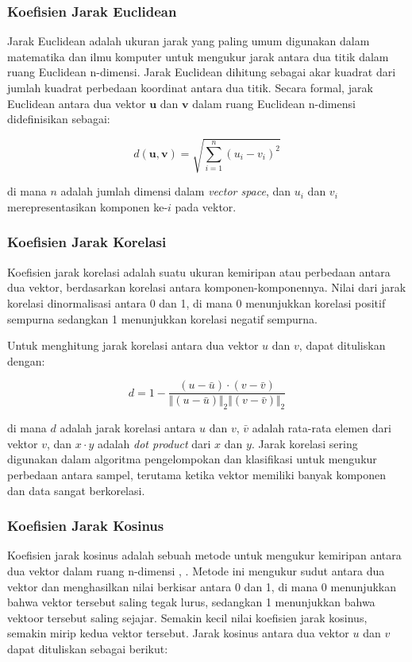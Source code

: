 \subsubsection{Koefisien Jarak Euclidean}
Jarak Euclidean adalah ukuran jarak yang paling umum digunakan dalam matematika dan ilmu komputer untuk mengukur jarak antara dua titik dalam ruang Euclidean n-dimensi. Jarak Euclidean dihitung sebagai akar kuadrat dari jumlah kuadrat perbedaan koordinat antara dua titik.
Secara formal, jarak Euclidean antara dua vektor $\mathbf{u}$ dan $\mathbf{v}$ dalam ruang Euclidean n-dimensi didefinisikan sebagai:

\begin{equation}
  d(\mathbf{u},\mathbf{v}) = \sqrt{\sum_{i=1}^{n}(u_i - v_i)^2}
\end{equation}

\noindent di mana $n$ adalah jumlah dimensi dalam \emph{vector space}, dan $u_i$ dan $v_i$ merepresentasikan komponen ke-$i$ pada vektor.

\subsubsection{Koefisien Jarak Korelasi}
Koefisien jarak korelasi adalah suatu ukuran kemiripan atau perbedaan antara dua vektor, berdasarkan korelasi antara komponen-komponennya. Nilai dari jarak korelasi dinormalisasi antara 0 dan 1, di mana 0 menunjukkan korelasi positif sempurna sedangkan 1 menunjukkan korelasi negatif sempurna.

Untuk menghitung jarak korelasi antara dua vektor $u$ dan $v$, dapat dituliskan dengan:

\begin{equation}
	d = 1-\frac{(u-\bar{u})\cdot (v-\bar{v})}{\Vert(u-\bar{u})\Vert_2\Vert(v-\bar{v})\Vert_2}
\end{equation}

\noindent di mana $d$ adalah jarak korelasi antara $u$ dan $v$, $\bar{v}$ adalah rata-rata elemen dari vektor $v$, dan $x\cdot y$ adalah \emph{dot product} dari $x$ dan $y$. Jarak korelasi sering digunakan dalam algoritma pengelompokan dan klasifikasi untuk mengukur perbedaan antara sampel, terutama ketika vektor memiliki banyak komponen dan data sangat berkorelasi.

\subsubsection{Koefisien Jarak Kosinus}
Koefisien jarak kosinus adalah sebuah metode untuk mengukur kemiripan antara dua vektor dalam ruang n-dimensi \cite{schutze2008introduction}, \cite{deisenroth2020mathematics}. Metode ini mengukur sudut antara dua vektor dan menghasilkan nilai berkisar antara 0 dan 1, di mana 0 menunjukkan bahwa vektor tersebut saling tegak lurus, sedangkan 1 menunjukkan bahwa vektoor tersebut saling sejajar. Semakin kecil nilai koefisien jarak kosinus, semakin mirip kedua vektor tersebut. Jarak kosinus antara dua vektor $u$ dan $v$ dapat dituliskan sebagai berikut:

